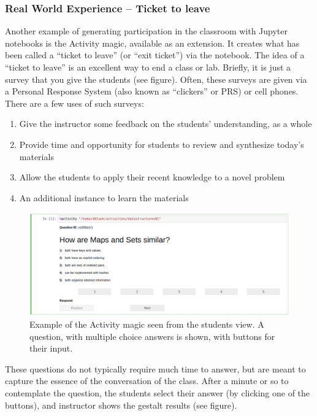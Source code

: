 \documentclass[]{book}
\providecommand{\tightlist}{%
  \setlength{\itemsep}{0pt}\setlength{\parskip}{0pt}}
\begin{document}
\subsubsection{Real World Experience -- Ticket to
leave}\label{real-world-experience-ticket-to-leave}

Another example of generating participation in the classroom with
Jupyter notebooks is the Activity magic, available as an extension. It
creates what has been called a ``ticket to leave'' (or ``exit ticket'')
via the notebook. The idea of a ``ticket to leave'' is an excellent way
to end a class or lab. Briefly, it is just a survey that you give the
students (see figure). Often, these surveys are given via a Personal
Response System (also known as ``clickers'' or PRS) or cell phones.
There are a few uses of such surveys:

\begin{enumerate}
\def\labelenumi{\arabic{enumi}.}
\tightlist
\item
  Give the instructor some feedback on the students' understanding, as a
  whole
\item
  Provide time and opportunity for students to review and synthesize
  today's materials
\item
  Allow the students to apply their recent knowledge to a novel problem
\item
  An additional instance to learn the materials
\end{enumerate}

\begin{figure}
\centering
\includegraphics{images/activity-magic-student.png}
\caption{Example of the Activity magic seen from the students view. A
question, with multiple choice answers is shown, with buttons for their
input.}
\end{figure}

These questions do not typically require much time to answer, but are
meant to capture the essence of the conversation of the class. After a
minute or so to contemplate the question, the students select their
answer (by clicking one of the buttons), and instructor shows the
gestalt results (see figure).
\end{document}
